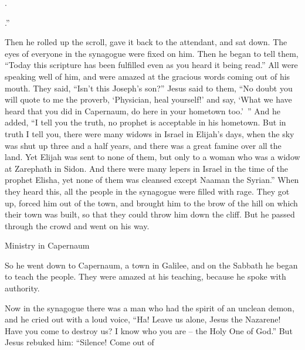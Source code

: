 {{{{}}}.
\par }{
\par }{
\par }{
\par }{\Q {}.”
\par }{\PP {}Then
he rolled up
the scroll,
gave
it back
to
the attendant,
and sat down.
The eyes
of everyone
in
the synagogue
were
fixed
on him.
Then
he began
to tell
them,
“Today
this
scripture
has been fulfilled
even as
you
heard it being read.”
All
were speaking well
of him,
and
were amazed
at
the gracious
words
coming out
of
his
mouth.
They said,
“Isn’t
this
Joseph’s
son?”
Jesus said
to
them,
“No doubt
you will quote
to me
the proverb,
‘Physician,
heal
yourself!’ and say, ‘What
we have heard
that you did
in
Capernaum,
do
here
in
your
hometown
too.’ ”
And
he added, “I tell
you
the truth,
no
prophet
is
acceptable
in
his
hometown.
But
in
truth
I tell
you,
there were
many
widows
in
Israel
in
Elijah’s
days,
when
the sky
was shut up
three
and a half
years,
and
there was
a great
famine
over
all
the land.
Yet
Elijah
was sent
to
none
of them,
but only
to
a woman
who was a widow
at
Zarephath
in Sidon.
And
there were
many
lepers
in
Israel
in
the time of
the prophet
Elisha,
yet
none
of them
was cleansed
except
Naaman
the Syrian.”
When
they heard
this,
all the people
in
the synagogue
were filled
with rage.
They got up,
forced
him
out of
the town,
and
brought
him
to
the brow
of the hill
on
which
their
town
was built,
so that
they could throw
him
down the cliff.
But
he
passed
through
the crowd
and went on
his
way.
\par }{\SH Ministry in Capernaum
\par }{\PP {}So
he went down
to
Capernaum,
a town
in Galilee,
and
on
the Sabbath
he
began to teach
the people.
They were amazed
at
his
teaching,
because
he
spoke
with
authority.
\par }{\PP {}Now
in
the synagogue
there was
a man
who had
the spirit
of an unclean
demon,
and
he cried out
with a loud
voice,
“Ha! Leave us
alone, Jesus
the Nazarene! Have you come
to destroy
us? I know
who
you
are
– the Holy One
of God.”
But
Jesus
rebuked
him: “Silence! Come out
of
}
